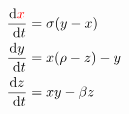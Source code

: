\documentclass[preview]{standalone}
\begin{document}
\begin{center}
\[
            \begin{aligned}
            \frac{\mathrm{d} {\color{red} x}}{\mathrm{~d} t} & =\sigma(y-x) \\
            \frac{\mathrm{d} y}{\mathrm{~d} t} & = x(\rho-z)-y \\
            \frac{\mathrm{d} z}{\mathrm{~d} t} & = x y-\beta z
            \end{aligned}
            \]
\end{center}
\end{document}
